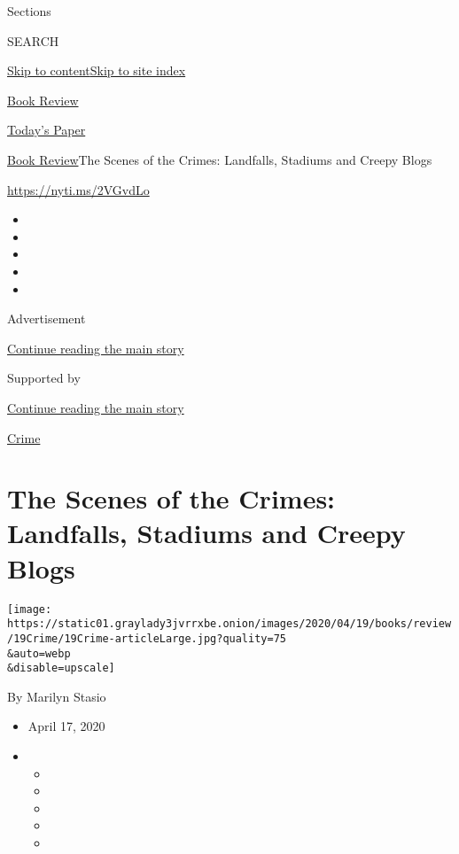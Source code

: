 Sections

SEARCH

\protect\hyperlink{site-content}{Skip to
content}\protect\hyperlink{site-index}{Skip to site index}

\href{https://www.nytimes3xbfgragh.onion/section/books/review}{Book
Review}

\href{https://myaccount.nytimes3xbfgragh.onion/auth/login?response_type=cookie\&client_id=vi}{}

\href{https://www.nytimes3xbfgragh.onion/section/todayspaper}{Today's
Paper}

\href{/section/books/review}{Book Review}\textbar{}The Scenes of the
Crimes: Landfalls, Stadiums and Creepy Blogs

\url{https://nyti.ms/2VGvdLo}

\begin{itemize}
\item
\item
\item
\item
\item
\end{itemize}

Advertisement

\protect\hyperlink{after-top}{Continue reading the main story}

Supported by

\protect\hyperlink{after-sponsor}{Continue reading the main story}

\href{/column/crime}{Crime}

\hypertarget{the-scenes-of-the-crimes-landfalls-stadiums-and-creepy-blogs}{%
\section{The Scenes of the Crimes: Landfalls, Stadiums and Creepy
Blogs}\label{the-scenes-of-the-crimes-landfalls-stadiums-and-creepy-blogs}}

\texttt{[image: https://static01.graylady3jvrrxbe.onion/images/2020/04/19/books/review/19Crime/19Crime-articleLarge.jpg?quality=75\\\&auto=webp\\\&disable=upscale]}

By Marilyn Stasio

\begin{itemize}
\item
  April 17, 2020
\item
  \begin{itemize}
  \item
  \item
  \item
  \item
  \item
  \end{itemize}
\end{itemize}


